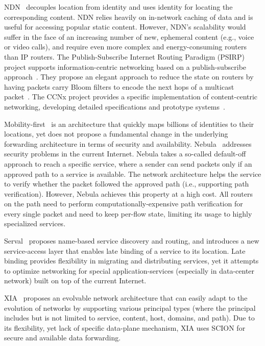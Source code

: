 \documentclass[a4paper]{llncs}
\newcommand\SCION{{\small\textsf{SCION}}\xspace}
\begin{document}
NDN~\cite{Jacobson09ccn,ndn-url} decouples location from identity and uses
identity for locating the corresponding content. NDN relies heavily on
in-network caching of data and is useful for accessing popular static content.
However, NDN's scalability would suffer in the face of an increasing number of
new, ephemeral content (e.g., voice or video calls), and require even more
complex and energy-consuming routers than IP routers.  The Publish-Subscribe
Internet Routing Paradigm (PSIRP) project supports information-centric
networking based on a publish-subscribe approach~\cite{PSIRP}. They propose an
elegant approach to reduce the state on routers by having packets carry Bloom
filters to encode the next hops of a multicast packet~\cite{JZEAN2009}.  The
CCNx project provides a specific implementation of content-centric networking,
developing detailed specifications and prototype systems~\cite{ccnx}.

Mobility-first~\cite{RaNaVe2012} is an architecture that quickly maps billions
of identities to their locations, yet does not propose a fundamental change in
the underlying forwarding architecture in terms of security and availability.
Nebula~\cite{Nebula} addresses security problems in the current Internet.
Nebula takes a so-called default-off approach to reach a specific service,
where a sender can send packets only if an approved path to a service is
available. The network architecture helps the service to verify whether the
packet followed the approved path (i.e., supporting path verification).
However, Nebula achieves this property at a high cost. All routers on the path
need to perform computationally-expensive path verification for every single
packet and need to keep per-flow state, limiting its usage to highly
specialized services. 

Serval~\cite{NSGKAKRF2012} proposes name-based service discovery and routing,
and introduces a new service-access layer that enables late binding of a
service to its location. Late binding provides flexibility in migrating and
distributing services, yet it attempts to optimize networking for special
application-services (especially in data-center network) built on top of the
current Internet. 

XIA~\cite{Han12xia} proposes an evolvable network architecture that can easily
adapt to the evolution of networks by supporting various principal types (where
the principal includes but is not limited to service, content, host, domains,
and path). Due to its flexibility, yet lack of specific data-plane mechanism,
XIA uses \SCION for secure and available data forwarding.  
\end{document}
